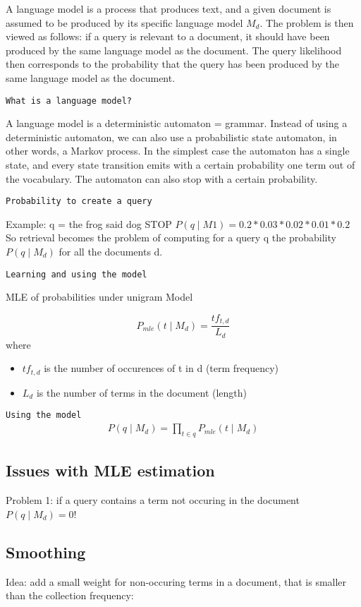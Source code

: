 A language model is a process that produces text, and a given document
is assumed to be produced by its specific language model $ M_d $. The
problem is then viewed as follows: if a query is relevant to a
document, it should have been produced by the same language model as
the document. The query likelihood then corresponds to the probability
that the query has been produced by the same language model as the
document.

\texttt{What is a language model?}

A language model is a deterministic automaton = grammar.
Instead of using a deterministic automaton, we can also use a
probabilistic state automaton, in other words, a Markov process. In
the simplest case the automaton has a single state, and every state
transition emits with a certain probability one term out of the
vocabulary. The automaton can also stop with a certain probability.

\texttt{Probability to create a query}

Example: q = the frog said dog STOP
$ P(q \mid M1) = 0.2 * 0.03 * 0.02 * 0.01 * 0.2 $ \\

So retrieval becomes the problem of computing for a query q the
probability $ P(q \mid M_d) $ for all the documents d.

\texttt{Learning and using the model}

MLE of probabilities under unigram Model

$$
P_{mle}(t \mid M_d) = \frac{tf_{t,d}}{L_d}
$$
where
\begin{itemize}
\item $ tf_{t,d} $ is the number of occurences of t in d (term
  frequency)
\item $ L_d $ is the number of terms in the document (length)
\end{itemize}

\texttt{Using the model}
\begin{align*}
  P(q \mid M_d) = \prod_{t \in q} P_{mle}(t \mid M_d)
\end{align*}

\subsection{Issues with MLE estimation}
Problem 1: if a query contains a term not occuring in the document $
P(q \mid M_d) = 0 $! \\

\subsection{Smoothing}
Idea: add a small weight for non-occuring terms in a document, that is
smaller than the collection frequency:

